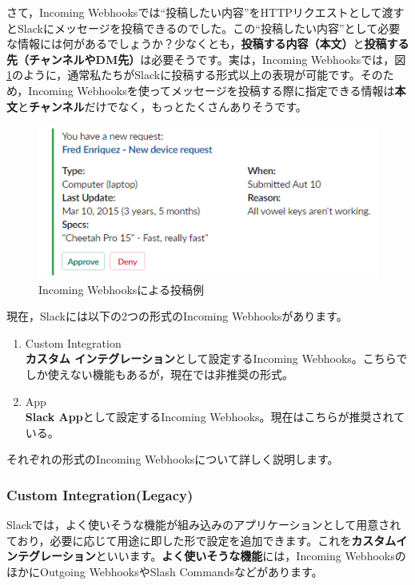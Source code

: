 \documentclass[uplatex,a4j]{jsarticle}
\begin{document}
さて，Incoming Webhooksでは``投稿したい内容''をHTTPリクエストとして渡すとSlackにメッセージを投稿できるのでした。この``投稿したい内容''として必要な情報には何があるでしょうか？少なくとも，\textbf{投稿する内容（本文）}と\textbf{投稿する先（チャンネルやDM先）}は必要そうです。実は，Incoming Webhooksでは，図\ref{fig:webhook_sample}のように，通常私たちがSlackに投稿する形式以上の表現が可能です。そのため，Incoming Webhooksを使ってメッセージを投稿する際に指定できる情報は\textbf{本文}と\textbf{チャンネル}だけでなく，もっとたくさんありそうです。

\begin{figure}[h]
 \centering
 \includegraphics[keepaspectratio, scale=0.8]{images/webhook_sample.png}
 \caption{Incoming Webhooksによる投稿例}
 \label{fig:webhook_sample}
\end{figure}

現在，Slackには以下の2つの形式のIncoming Webhooksがあります。
\begin{enumerate}
\item Custom Integration\\
\textbf{カスタム インテグレーション}として設定するIncoming Webhooks。こちらでしか使えない機能もあるが，現在では非推奨の形式。
\item App\\
\textbf{Slack App}として設定するIncoming Webhooks。現在はこちらが推奨されている。
\end{enumerate}

それぞれの形式のIncoming Webhooksについて詳しく説明します。

\subsubsection{Custom Integration(Legacy)}

Slackでは，よく使いそうな機能が組み込みのアプリケーションとして用意されており，必要に応じて用途に即した形で設定を追加できます。これを\textbf{カスタムインテグレーション}といいます。\textbf{よく使いそうな機能}には，Incoming WebhooksのほかにOutgoing WebhooksやSlash Commandsなどがあります。
\end{document}
